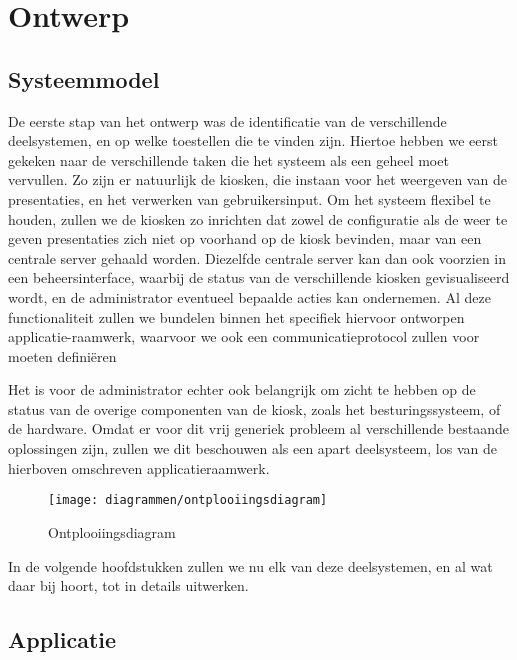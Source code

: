 \part{Ontwerp}
\label{part:ontwerp}

%
%

\chapter{Systeemmodel}
\label{chap:systeemmodel}

De eerste stap van het ontwerp was de identificatie van de verschillende deelsystemen, en op welke toestellen die te vinden zijn. Hiertoe hebben we eerst gekeken naar de verschillende taken die het systeem als een geheel moet vervullen. Zo zijn er natuurlijk de kiosken, die instaan voor het weergeven van de presentaties, en het verwerken van gebruikersinput. Om het systeem flexibel te houden, zullen we de kiosken zo inrichten dat zowel de configuratie als de weer te geven presentaties zich niet op voorhand op de kiosk bevinden, maar van een centrale server gehaald worden. Diezelfde centrale server kan dan ook voorzien in een beheersinterface, waarbij de status van de verschillende kiosken gevisualiseerd wordt, en de administrator eventueel bepaalde acties kan ondernemen. Al deze functionaliteit zullen we bundelen binnen het specifiek hiervoor ontworpen applicatie-raamwerk, waarvoor we ook een communicatieprotocol zullen voor moeten definiëren

Het is voor de administrator echter ook belangrijk om zicht te hebben op de status van de overige componenten van de kiosk, zoals het besturingssysteem, of de hardware. Omdat er voor dit vrij generiek probleem al verschillende bestaande oplossingen zijn, zullen we dit beschouwen als een apart deelsysteem, los van de hierboven omschreven applicatieraamwerk.

\begin{figure}
	\texttt{[image: diagrammen/ontplooiingsdiagram]}
	\caption{Ontplooiingsdiagram}
\end{figure}

In de volgende hoofdstukken zullen we nu elk van deze deelsystemen, en al wat daar bij hoort, tot in details uitwerken.

%
%

\chapter{Applicatie}
\label{chap:applicatie}

